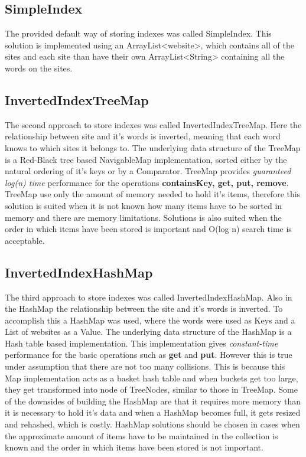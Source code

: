 \subsection{SimpleIndex}
The provided default way of storing indexes was called SimpleIndex. This solution is implemented using an ArrayList<website>, which contains all of the sites and each site than have their own ArrayList<String>  containing all the words on the sites. \\

\subsection{InvertedIndexTreeMap}
The second approach to store indexes was called InvertedIndexTreeMap. Here the relationship between site and it's words is inverted, meaning that each word knows to which sites it belongs to. The underlying data structure of the TreeMap is a Red-Black tree based NavigableMap implementation, sorted either by the natural ordering of it's keys or by a Comparator. TreeMap provides \textit{guaranteed log(n) time} performance for the operations \textbf{containsKey, get, put, remove}.\cite{oracle:treemap} TreeMap use only the amount of memory needed to hold it's items, therefore this solution is suited when it is not known how many items have to be sorted in memory and there are memory limitations. Solutions is also suited when the order in which items have been stored is important and O(log n) search time is acceptable. \cite{baeldung:HashTreeCompared} 

\subsection{InvertedIndexHashMap}
The third approach to store indexes was called InvertedIndexHashMap. Also in the HashMap the relationship between the site and it's words is inverted. To accomplish this a HashMap was used, where the words were used as Keys and  a List of websites as a Value. 
The underlying data structure of the HashMap is a Hash table based implementation. This implementation gives \textit{constant-time} performance for the basic operations such as \textbf{get} and \textbf{put}. \cite{oracle:hashmap} However this is true under assumption that there are not too many collisions. This is because this Map implementation acts as a basket hash table and when buckets get too large, they get transformed into node of  TreeNodes, similar to those in TreeMap. \cite{baeldung:HashTreeCompared} Some of the downsides of building the HashMap are that it requires more memory than it is necessary to hold it's data and when a HashMap becomes full, it gets resized and rehashed, which is costly. HashMap solutions should be chosen in cases when the approximate amount of items have to be maintained in the collection is known and the order in which items have been stored is not important. \cite{baeldung:HashTreeCompared} 


